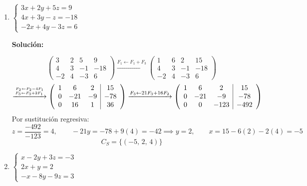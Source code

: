 \documentclass[12pt]{article}
\newcommand{\solucion}{%
    \vspace{0.8em}%
    \textbf{Solución:}%
}
\begin{document}
\begin{enumerate}[label=\alph*.-]
    \item $\begin{cases} 3x + 2y + 5z = 9 \\ 4x + 3y - z = -18 \\ -2x + 4y - 3z = 6 \end{cases}$

    \solucion
    \[
    \left(\begin{array}{ccc|c}
    3 & 2 & 5 & 9 \\ 4 & 3 & -1 & -18 \\ -2 & 4 & -3 & 6
    \end{array}\right)
    \xrightarrow{F_1 \leftarrow F_1 + F_3}
    \left(\begin{array}{ccc|c}
    1 & 6 & 2 & 15 \\ 4 & 3 & -1 & -18 \\ -2 & 4 & -3 & 6
    \end{array}\right)
    \]
    \[
    \xrightarrow{F_2 \leftarrow F_2 - 4F_1 \atop F_3 \leftarrow F_3 + 2F_1}
    \left(\begin{array}{ccc|c}
    1 & 6 & 2 & 15 \\ 0 & -21 & -9 & -78 \\ 0 & 16 & 1 & 36
    \end{array}\right)
    \xrightarrow{F_3 \leftarrow 21F_3 + 16F_2}
    \left(\begin{array}{ccc|c}
    1 & 6 & 2 & 15 \\ 0 & -21 & -9 & -78 \\ 0 & 0 & -123 & -492
    \end{array}\right)
    \]
    Por sustitución regresiva:
    \[
    z = \frac{-492}{-123} = 4, \qquad
    -21y = -78 + 9(4) = -42 \implies y = 2, \qquad
    x = 15 - 6(2) - 2(4) = -5
    \]
    \[
    \boxed{C_S = \{(-5,\,2,\,4)\}}
    \]

    \newpage
    \item $\begin{cases} x - 2y + 3z = -3 \\ 2x + y = 2 \\ -x - 8y - 9z = 3 \end{cases}$


\end{enumerate}
\end{document}
